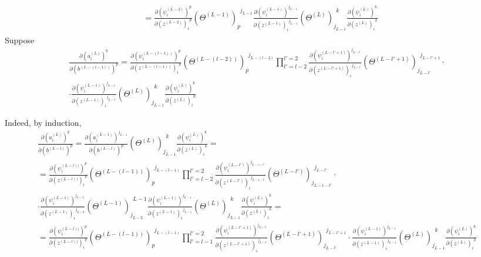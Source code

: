\documentclass[10pt]{amsart}
\begin{document}
\begin{multicols*}{2}
\[\begin{gathered}
\begin{aligned}
& = \frac{ \partial ( \psi_i^{(L-2)})^{ p } }{ \partial (z^{(L-2)})_i^{\  \  p } }  ( \Theta^{(L-1)})_{ p }^{\  \  j_{L-1}}    \frac{\partial (\psi^{(L-1)}_i)^{j_{L-1}} }{ \partial (z^{(L-1)})_i^{\  \  j_{L-1}} }   (\Theta^{(L)})_{j_{L-1}}^{\  \  k}  \frac{\partial (\psi^{(L)}_i)^k }{ \partial (z^{(L)})_i^{\  \  k} }
\end{aligned}
\end{gathered}
\]
Suppose 
\begin{equation}
\boxed{ \begin{gathered}
\frac{ \partial ( a_i^{(L)})^k }{ \partial (b^{(L-(l-1))})^p} = \frac{ \partial ( \psi_i^{(L-(l-1))})^{ p } }{ \partial (z^{(L-(l-1))})_i^{\  \  p } }  ( \Theta^{(L-(l-2))})_{ p }^{\  \  j_{L- (l-2)  }} \prod_{l'=l-2}^{l'=2 }  \frac{ \partial ( \psi_i^{(L-l'+1)})^{ j_{L-l'} } }{ \partial (z^{(L-l'+1)})_i^{\  \  j_{L-l'} } }  ( \Theta^{(L-l'+1)})_{ j_{L-l'} }^{\  \  j_{L-l'+1}} \cdot \\
\cdot \frac{ \partial ( \psi_i^{(L-1)})^{ j_{L-1} } }{ \partial (z^{(L-1)})_i^{\  \  j_{L-1} } }  ( \Theta^{(L)})_{ j_{L-1} }^{\  \  k} \frac{ \partial ( \psi_i^{(L)})^{ k } }{ \partial (z^{(L)})_i^{\  \  k } }       
\end{gathered} }
\end{equation}

Indeed, by induction, 
\[
\begin{gathered}
\frac{ \partial ( a_i^{(L)})^k }{ \partial (b^{(L-l)})^p} = \frac{ \partial ( a_i^{(L-1)})^{ j_{L-1} } }{ \partial (b^{(L-l)})^{    p } }  ( \Theta^{(L)})_{ j_{L-1} }^{\  \  k} \frac{ \partial ( \psi_i^{(L)})^{ k } }{ \partial (z^{(L)})_i^{\  \  k } }   = \\
=  \frac{ \partial ( \psi_i^{(L-l))})^{ p } }{ \partial (z^{(L-l))})_i^{\  \  p } }  ( \Theta^{(L-(l-1))})_{ p }^{\  \  j_{L- (l-1)  }} \prod_{l'=l-2}^{l'=2 }  \frac{ \partial ( \psi_i^{(L-l')})^{ j_{L-1-l'} } }{ \partial (z^{(L-l')})_i^{\  \  j_{L-1-l'} } }  ( \Theta^{(L-l')})_{ j_{L-1-l'} }^{\  \  j_{L-l'}} \cdot \\
\cdot \frac{ \partial ( \psi_i^{(L-1)})^{ j_{L-2} } }{ \partial (z^{(L-1)})_i^{\  \  j_{L-2} } }  ( \Theta^{(L-1)})_{ j_{L-2} }^{\  \  L-1} \frac{ \partial ( \psi_i^{(L-1)})^{ j_{L-1} } }{ \partial (z^{(L-1)})_i^{\  \  j_{L-1} } } ( \Theta^{(L)})_{ j_{L-1} }^{\  \  k} \frac{ \partial ( \psi_i^{(L)})^{ k } }{ \partial (z^{(L)})_i^{\  \  k } }       = \\
= \frac{ \partial ( \psi_i^{(L-l))})^{ p } }{ \partial (z^{(L-l))})_i^{\  \  p } }  ( \Theta^{(L-(l-1))})_{ p }^{\  \  j_{L- (l-1)  }} \prod_{l'=l-1}^{l'=2 }  \frac{ \partial ( \psi_i^{(L-l'+1)})^{ j_{L-l'} } }{ \partial (z^{(L-l'+1)})_i^{\  \  j_{L-l'} } }  ( \Theta^{(L-l'+1)})_{ j_{L-l'} }^{\  \  j_{L-l'+1}} \cdot  \frac{ \partial ( \psi_i^{(L-1)})^{ j_{L-1} } }{ \partial (z^{(L-1)})_i^{\  \  j_{L-1} } }  ( \Theta^{(L)})_{ j_{L-1} }^{\  \  k} \frac{ \partial ( \psi_i^{(L)})^{ k } }{ \partial (z^{(L)})_i^{\  \  k } }       
\end{gathered}
\]


\end{multicols*}
\end{document}

